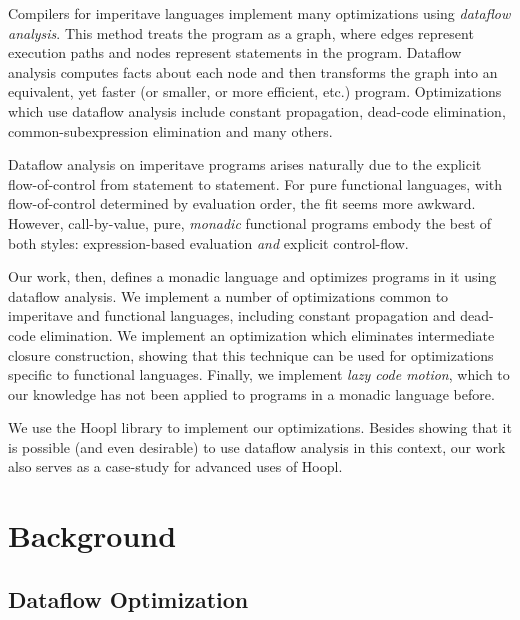 \documentclass[11pt]{article}
\begin{document}
Compilers for imperitave languages implement many optimizations using
\emph{dataflow analysis}. This method treats the program as a graph,
where edges represent execution paths and nodes represent statements
in the program. Dataflow analysis computes facts about each node and
then transforms the graph into an equivalent, yet faster (or smaller,
or more efficient, etc.) program. Optimizations which use dataflow
analysis include constant propagation, dead-code elimination,
common-subexpression elimination and many others.

Dataflow analysis on imperitave programs arises naturally due to the
explicit flow-of-control from statement to statement. For pure
functional languages, with flow-of-control determined by evaluation
order, the fit seems more awkward. However, call-by-value, pure,
\emph{monadic} functional programs embody the best of both
styles: expression-based evaluation \emph{and} explicit
control-flow. 

Our work, then, defines a monadic language and optimizes programs in
it using dataflow analysis. We implement a number of optimizations
common to imperitave and functional languages, including constant
propagation and dead-code elimination. We implement an optimization
which eliminates intermediate closure construction, showing that this
technique can be used for optimizations specific to functional
languages. Finally, we implement \emph{lazy code motion}, which to our
knowledge has not been applied to programs in a monadic language
before.

We use the Hoopl library  to implement our
optimizations. Besides showing that it is possible (and even
desirable) to use dataflow analysis in this context, our work 
also serves as a case-study for advanced uses of Hoopl. 

\section{Background}



\subsection{Dataflow Optimization}
\end{document}
